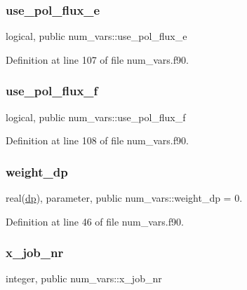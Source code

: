 \subsubsection{\texorpdfstring{use\+\_\+pol\+\_\+flux\+\_\+e}{use\_pol\_flux\_e}}
{\footnotesize\ttfamily logical, public num\+\_\+vars\+::use\+\_\+pol\+\_\+flux\+\_\+e}



Definition at line 107 of file num\+\_\+vars.\+f90.

\mbox{\label{namespacenum__vars_ae21ec57b791e369c3558c0eb3da1555b}} 
\subsubsection{\texorpdfstring{use\+\_\+pol\+\_\+flux\+\_\+f}{use\_pol\_flux\_f}}
{\footnotesize\ttfamily logical, public num\+\_\+vars\+::use\+\_\+pol\+\_\+flux\+\_\+f}



Definition at line 108 of file num\+\_\+vars.\+f90.

\mbox{\label{namespacenum__vars_ad5be06791ebf0ca75fc6dc7339916ae8}} 
\subsubsection{\texorpdfstring{weight\+\_\+dp}{weight\_dp}}
{\footnotesize\ttfamily real(\hyperlink{namespacenum__vars_a03802aa2bd86439d7a9370836fabf3f2}{dp}), parameter, public num\+\_\+vars\+::weight\+\_\+dp = 0.}



Definition at line 46 of file num\+\_\+vars.\+f90.

\mbox{\label{namespacenum__vars_a9df427f6582f4528652b3607d1c681b3}} 
\subsubsection{\texorpdfstring{x\+\_\+job\+\_\+nr}{x\_job\_nr}}
{\footnotesize\ttfamily integer, public num\+\_\+vars\+::x\+\_\+job\+\_\+nr}



